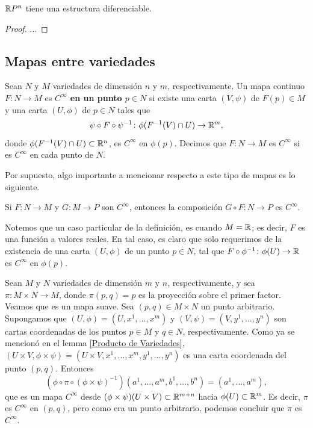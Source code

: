 \begin{proposition}
	$\mathbb{R} P^{n}$ tiene una estructura diferenciable.
\end{proposition}
\begin{proof}
	...
\end{proof}

\subsection{Mapas entre variedades}

\begin{definition}
	Sean $N$ y $M$ variedades de dimensión $n$ y $m$, respectivamente. Un mapa continuo $F \colon N \to M$ es \textbf{$C^{\infty}$ en un punto $p \in N$} si existe una carta $(V,\psi)$ de $F(p) \in M$ y una carta $(U,\phi)$ de $p \in N$ tales que 
	\[ \psi \circ F \circ \psi^{-1} \colon \phi(F^{-1}(V) \cap U) \to \mathbb{R}^{m}, \]
	donde $\phi(F^{-1}(V) \cap U) \subset \mathbb{R}^{n}$, es $C^{\infty}$ en $\phi(p)$. Decimos que $F \colon N \to M$ es $C^{\infty}$ si es $C^{\infty}$ en cada punto de $N$.
\end{definition}

Por supuesto, algo importante a mencionar respecto a este tipo de mapas es lo siguiente.

\begin{lemma}
	Si $F \colon N \to M$ y $G \colon M \to P$ son $C^{\infty}$, entonces la composición $G \circ F \colon N \to P$ es $C^{\infty}$.
\end{lemma}

Notemos que un caso particular de la definición, es cuando $M = \mathbb{R}$; es decir, $F$ es una función a valores reales. En tal caso, es claro que solo requerimos de la existencia de una carta $(U, \phi)$ de un punto $p \in N$, tal que $F \circ \phi^{-1} \colon \phi(U) \to \mathbb{R}$ es $C^{\infty}$ en $\phi(p)$.

\begin{example}
	Sean $M$ y $N$ variedades de dimensión $m$ y $n$, respectivamente, y sea $\pi \colon M \times N \to M$, donde $\pi(p,q) = p$ es la proyección sobre el primer factor. Veamos que es un mapa suave. Sea $(p,q) \in M \times N$ un punto arbitrario. Supongamos que $(U,\phi) = (U,x^{1},\dots,x^{m})$ y $(V,\psi) = (V,y^{1},\dots,y^{n})$ son cartas coordenadas de los puntos $p \in M$ y $q \in N$, respectivamente. Como ya se mencionó en el lemma \ref{Producto de Variedades}, $(U \times V, \phi \times \psi) = (U \times V, x^{1},\dots,x^{m},y^{1},\dots,y^{n})$ es una carta coordenada del punto $(p,q)$. Entonces
	\[ (\phi \circ \pi \circ (\phi \times \psi)^{-1})(a^{1},\dots,a^{m},b^{1},\dots,b^{n}) = (a^{1},\dots,a^{m}), \]
	que es un mapa $C^{\infty}$ desde $(\phi \times \psi)(U \times V) \subset \mathbb{R}^{m+n}$ hacia $\phi(U) \subset \mathbb{R}^{m}$. Es decir, $\pi$ es $C^{\infty}$ en $(p,q)$, pero como era un punto arbitrario, podemos concluir que $\pi$ es $C^{\infty}$.
\end{example}

